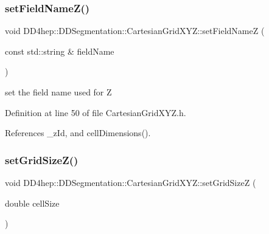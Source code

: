\hypertarget{class_d_d4hep_1_1_d_d_segmentation_1_1_cartesian_grid_x_y_z_a80a938d9852e6dcca0b81365b347f6ea}{}\label{class_d_d4hep_1_1_d_d_segmentation_1_1_cartesian_grid_x_y_z_a80a938d9852e6dcca0b81365b347f6ea} 
\subsubsection{\texorpdfstring{set\+Field\+Name\+Z()}{setFieldNameZ()}}
{\footnotesize\ttfamily void D\+D4hep\+::\+D\+D\+Segmentation\+::\+Cartesian\+Grid\+X\+Y\+Z\+::set\+Field\+NameZ (\begin{DoxyParamCaption}\item[{const std\+::string \&}]{field\+Name }\end{DoxyParamCaption})\hspace{0.3cm}{\ttfamily [inline]}}



set the field name used for Z 



Definition at line 50 of file Cartesian\+Grid\+X\+Y\+Z.\+h.



References \+\_\+z\+Id, and cell\+Dimensions().

\hypertarget{class_d_d4hep_1_1_d_d_segmentation_1_1_cartesian_grid_x_y_z_a1350853bf74f0de0d12b1fa1bf9c1f09}{}\label{class_d_d4hep_1_1_d_d_segmentation_1_1_cartesian_grid_x_y_z_a1350853bf74f0de0d12b1fa1bf9c1f09} 
\subsubsection{\texorpdfstring{set\+Grid\+Size\+Z()}{setGridSizeZ()}}
{\footnotesize\ttfamily void D\+D4hep\+::\+D\+D\+Segmentation\+::\+Cartesian\+Grid\+X\+Y\+Z\+::set\+Grid\+SizeZ (\begin{DoxyParamCaption}\item[{double}]{cell\+Size }\end{DoxyParamCaption})\hspace{0.3cm}{\ttfamily [inline]}}



